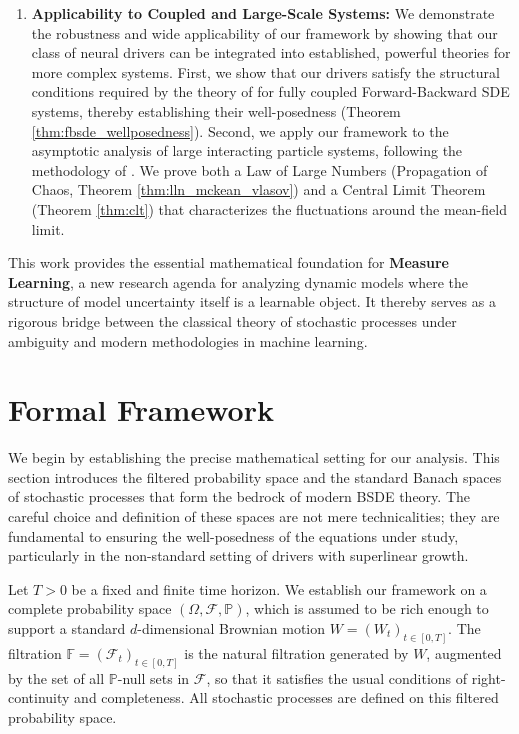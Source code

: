 \documentclass[qian]{imsart}
\newcommand{\Prob}{\mathbb{P}}
\newcommand{\Fcal}{\mathcal{F}}
\theoremstyle{plain}
\theoremstyle{definition}
\begin{document}
\begin{enumerate}[label=(\roman*)]
    \item \textbf{Applicability to Coupled and Large-Scale Systems:} We demonstrate the robustness and wide applicability of our framework by showing that our class of neural drivers can be integrated into established, powerful theories for more complex systems. First, we show that our drivers satisfy the structural conditions required by the theory of \cite{Delarue2002} for fully coupled Forward-Backward SDE systems, thereby establishing their well-posedness (Theorem \ref{thm:fbsde_wellposedness}). Second, we apply our framework to the asymptotic analysis of large interacting particle systems, following the methodology of \cite{CarmonaDelarue2018}. We prove both a Law of Large Numbers (Propagation of Chaos, Theorem \ref{thm:lln_mckean_vlasov}) and a Central Limit Theorem (Theorem \ref{thm:clt}) that characterizes the fluctuations around the mean-field limit.
\end{enumerate}

This work provides the essential mathematical foundation for \textbf{Measure Learning}, a new research agenda for analyzing dynamic models where the structure of model uncertainty itself is a learnable object. It thereby serves as a rigorous bridge between the classical theory of stochastic processes under ambiguity and modern methodologies in machine learning.


\section{Formal Framework}
\label{sec:formal_framework}

We begin by establishing the precise mathematical setting for our analysis. This section introduces the filtered probability space and the standard Banach spaces of stochastic processes that form the bedrock of modern BSDE theory. The careful choice and definition of these spaces are not mere technicalities; they are fundamental to ensuring the well-posedness of the equations under study, particularly in the non-standard setting of drivers with superlinear growth.

Let $T > 0$ be a fixed and finite time horizon. We establish our framework on a complete probability space $(\Omega, \Fcal, \Prob)$, which is assumed to be rich enough to support a standard $d$-dimensional Brownian motion $W = (W_t)_{t \in [0,T]}$. The filtration $\mathbb{F} = (\Fcal_t)_{t \in [0,T]}$ is the natural filtration generated by $W$, augmented by the set of all $\Prob$-null sets in $\Fcal$, so that it satisfies the usual conditions of right-continuity and completeness. All stochastic processes are defined on this filtered probability space.
\end{document}
